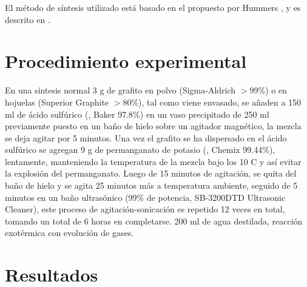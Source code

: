 El método de síntesis utilizado está basado en el propuesto por Hummers \citep{Hummers1958}, y es descrito en \citep{Abdolhosseinzadeh2015}.

\section{Procedimiento experimental}
En una síntesis normal 3 g de grafito en polvo (Sigma-Aldrich $>$99\%) o en hojuelas (Superior Graphite $>$80\%), tal como viene envasado, se añaden a 150 ml de ácido sulfúrico (, Baker 97.8\%) en un vaso precipitado de 250 ml previamente puesto en un baño de hielo sobre un agitador magnético, la mezcla se deja agitar por 5 minutos. Una vez el grafito se ha dispersado en el ácido sulfúrico se agregan 9 g de permanganato de potasio (, Chemix 99.44\%), lentamente, manteniendo la temperatura de la mezcla bajo los 10 C y así evitar la explosión del permanganato. Luego de 15 minutos de agitación, se quita del baño de hielo y se agita 25 minutos más a temperatura ambiente, seguido de 5 minutos en un baño ultrasónico (99\% de potencia, SB-3200DTD Ultrasonic Cleaner), este proceso de agitación-sonicación es repetido 12 veces en total, tomando un total de 6 horas en completarse. 200 ml de agua destilada, reacción exotérmica con evolución de gases.


\section{Resultados}
